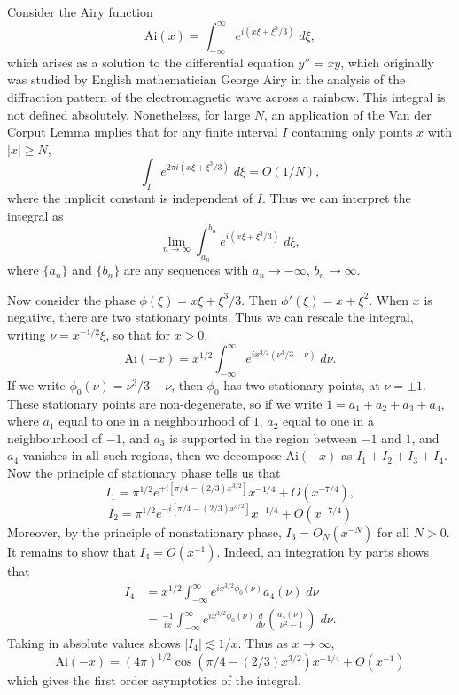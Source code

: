 \begin{example}
  Consider the Airy function
  \[ \text{Ai}(x) = \int_{-\infty}^\infty e^{i(x \xi + \xi^3/3)}\; d\xi, \]
  which arises as a solution to the differential equation $y'' = xy$, which originally was studied by English mathematician George Airy in the analysis of the diffraction pattern of the electromagnetic wave across a rainbow. This integral is not defined absolutely. Nonetheless, for large $N$, an application of the Van der Corput Lemma implies that for any finite interval $I$ containing only points $x$ with $|x| \geq N$,
  \[ \int_I e^{2 \pi i(x \xi + \xi^3/3)}\; d\xi = O(1/N), \]
  where the implicit constant is independent of $I$. Thus we can interpret the integral as
  \[ \lim_{n \to \infty} \int_{a_n}^{b_n} e^{i(x \xi + \xi^3/3)}\; d\xi, \]
  where $\{ a_n \}$ and $\{ b_n \}$ are any sequences with $a_n \to -\infty$, $b_n \to \infty$.

  Now consider the phase $\phi(\xi) = x \xi + \xi^3/3$. Then $\phi'(\xi) = x + \xi^2$. When $x$ is negative, there are two stationary points. Thus we can rescale the integral, writing $\nu = x^{-1/2} \xi$, so that for $x > 0$,
  \[ \text{Ai}(-x) = x^{1/2} \int_{-\infty}^\infty e^{i x^{3/2}(\nu^3/3 - \nu)}\; d\nu. \]
  If we write $\phi_0(\nu) = \nu^3/3 - \nu$, then $\phi_0$ has two stationary points, at $\nu = \pm 1$. These stationary points are non-degenerate, so if we write $1 = a_1 + a_2 + a_3 + a_4$, where $a_1$ equal to one in a neighbourhood of $1$, $a_2$ equal to one in a neighbourhood of $-1$, and $a_3$ is supported in the region between $-1$ and $1$, and $a_4$ vanishes in all such regions, then we decompose $\text{Ai}(-x)$ as $I_1 + I_2 + I_3 + I_4$. Now the principle of stationary phase tells us that
  \[ I_1 = \pi^{1/2} e^{+ i [\pi/4 - (2/3) x^{3/2} ]} x^{-1/4} + O(x^{-7/4}), \]
  \[ I_2 = \pi^{1/2} e^{- i [\pi/4 - (2/3) x^{3/2}]} x^{-1/4} + O(x^{-7/4}) \]
  Moreover, by the principle of nonstationary phase, $I_3 = O_N(x^{-N})$ for all $N > 0$. It remains to show that $I_4 = O(x^{-1})$. Indeed, an integration by parts shows that
  \begin{align*}
    I_4 &= x^{1/2} \int_{-\infty}^\infty e^{i x^{3/2} \phi_0(\nu)} a_4(\nu)\; d\nu\\
    &= \frac{-1}{i x} \int_{-\infty}^\infty e^{i x^{3/2} \phi_0(\nu)} \frac{d}{d\nu} \left( \frac{a_4(\nu)}{\nu^2 - 1} \right)\; d\nu.
  \end{align*}
  Taking in absolute values shows $|I_4| \lesssim 1/x$. Thus as $x \to \infty$,
  \[ \text{Ai}(-x) = (4\pi)^{1/2} \cos(\pi/4 - (2/3) x^{3/2}) x^{-1/4} + O(x^{-1}) \]
  which gives the first order asymptotics of the integral.


\end{example}

